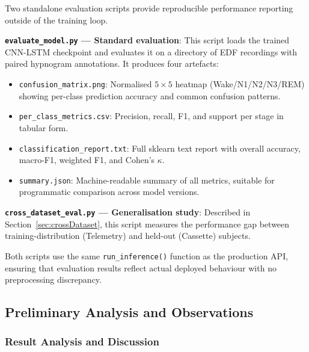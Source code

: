 \documentclass[10pt]{article}
\begin{document}
Two standalone evaluation scripts provide reproducible performance reporting outside of the training loop.

\textbf{\texttt{evaluate\_model.py} --- Standard evaluation}: This script loads the trained CNN-LSTM checkpoint and evaluates it on a directory of EDF recordings with paired hypnogram annotations. It produces four artefacts:

\begin{itemize}
  \item \texttt{confusion\_matrix.png}: Normalised $5 \times 5$ heatmap (Wake/N1/N2/N3/REM) showing per-class prediction accuracy and common confusion patterns.
  \item \texttt{per\_class\_metrics.csv}: Precision, recall, F1, and support per stage in tabular form.
  \item \texttt{classification\_report.txt}: Full sklearn text report with overall accuracy, macro-F1, weighted F1, and Cohen's $\kappa$.
  \item \texttt{summary.json}: Machine-readable summary of all metrics, suitable for programmatic comparison across model versions.
\end{itemize}

\textbf{\texttt{cross\_dataset\_eval.py} --- Generalisation study}: Described in Section~\ref{sec:crossDataset}, this script measures the performance gap between training-distribution (Telemetry) and held-out (Cassette) subjects.

Both scripts use the same \texttt{run\_inference()} function as the production API, ensuring that evaluation results reflect actual deployed behaviour with no preprocessing discrepancy.

\subsection{Preliminary Analysis and Observations}
\label{sec:preliminaryAnalysis}

\subsubsection{Result Analysis and Discussion}
\label{sec:resultAnalysis}
\end{document}
